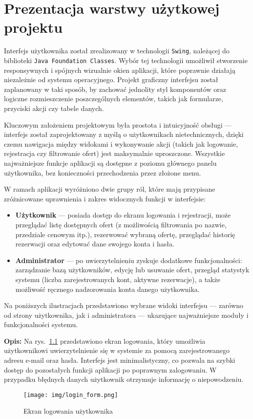 \chapter{Prezentacja warstwy użytkowej projektu}
\label{cha:Prezentacja warstwy użytkowej projektu}

Interfejs użytkownika został zrealizowany w technologii \texttt{Swing}, należącej do biblioteki \texttt{Java Foundation Classes}. Wybór tej technologii umożliwił stworzenie responsywnych i spójnych wizualnie okien aplikacji, które poprawnie działają niezależnie od systemu operacyjnego. Projekt graficzny interfejsu został zaplanowany w taki sposób, by zachować jednolity styl komponentów oraz logiczne rozmieszczenie poszczególnych elementów, takich jak formularze, przyciski akcji czy tabele danych.

Kluczowym założeniem projektowym była prostota i intuicyjność obsługi — interfejs został zaprojektowany z myślą o użytkownikach nietechnicznych, dzięki czemu nawigacja między widokami i wykonywanie akcji (takich jak logowanie, rejestracja czy filtrowanie ofert) jest maksymalnie uproszczone. Wszystkie najważniejsze funkcje aplikacji są dostępne z poziomu głównego panelu użytkownika, bez konieczności przechodzenia przez złożone menu.

W ramach aplikacji wyróżniono dwie grupy ról, które mają przypisane zróżnicowane uprawnienia i zakres widocznych funkcji w interfejsie:
\begin{itemize}
    \item \textbf{Użytkownik} — posiada dostęp do ekranu logowania i rejestracji, może przeglądać listę dostępnych ofert (z możliwością filtrowania po nazwie, przedziale cenowym itp.), rezerwować wybraną ofertę, przeglądać historię rezerwacji oraz edytować dane swojego konta i hasła.
    \item \textbf{Administrator} — po uwierzytelnieniu zyskuje dodatkowe funkcjonalności: zarządzanie bazą użytkowników, edycję lub usuwanie ofert, przegląd statystyk systemu (liczba zarejestrowanych kont, aktywne rezerwacje), a także możliwość ręcznego nadzorowania konta danego użytkownika.
\end{itemize}

Na poniższych ilustracjach przedstawiono wybrane widoki interfejsu — zarówno od strony użytkownika, jak i administratora — ukazujące najważniejsze moduły i funkcjonalności systemu.

\noindent
{\small \textbf{Opis:} Na rys.~\ref{fig:login_form} przedstawiono ekran logowania, który umożliwia użytkownikowi uwierzytelnienie się w systemie za pomocą zarejestrowanego adresu e-mail oraz hasła. Interfejs jest minimalistyczny, co pozwala na szybki dostęp do pozostałych funkcji aplikacji po poprawnym zalogowaniu. W przypadku błędnych danych użytkownik otrzymuje informację o niepowodzeniu.}
\begin{figure}[H]
    \centering
    \texttt{[image: img/login\_form.png]}
    \caption{Ekran logowania użytkownika}
    \label{fig:login_form}
\end{figure}

